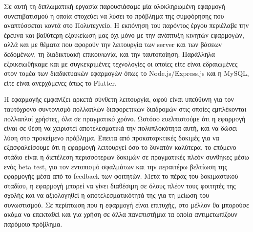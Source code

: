 \documentclass[../thesis.tex]{subfiles}
\begin{document}
Σε αυτή τη διπλωματική εργασία παρουσιάσαμε μία ολοκληρωμένη εφαρμογή συνεπιβατισμού η οποία στοχεύει να λύσει το πρόβλημα της συμφόρησης που αναπτύσσεται κοντά στο Πολυτεχνείο.
Η εκπόνηση του παρόντος έργου περιέλαβε την έρευνα και βαθύτερη εξοικείωσή μας όχι μόνο με την ανάπτυξη κινητών εφαρμογών, αλλά και με θέματα που αφορούν την λειτουργία των server και των βάσεων δεδομένων, τη διαδικτυακή επικοινωνία, και την ταυτοποίηση.
Παράλληλα εξοικειωθήκαμε και με συγκεκριμένες τεχνολογίες οι οποίες είτε είναι εδραιωμένες στον τομέα των διαδικτυακών εφαρμογών όπως το Node.js/Express.js και η MySQL, είτε είναι ανερχόμενες όπως το Flutter.

Η εφαρμογής εμφανίζει αρκετά σύνθετη λειτουργία, αφού είναι υπεύθυνη για τον ταυτόχρονο συντονισμό πολλαπλών διαφορετικών διαδρομών στις οποίες εμπλέκονται πολλαπλοί χρήστες, όλα σε πραγματικό χρόνο.
Ωστόσο ευελπιστούμε ότι η εφαρμογή είναι σε θέση να χειριστεί αποτελεσματικά την πολυπλοκότητα αυτή, και να δώσει λύση στο προκείμενο πρόβλημα.
Έπειτα από προκαταρκτικές δοκιμές για να εξασφαλείσουμε ότι η εφαρμογή λειτουργεί όσο το δυνατόν καλύτερα, το επόμενο στάδιο είναι η διετέλεση περισσότερων δοκιμών σε πραγματικές πλεόν συνθήκες μέσω ενός beta test, για τον εντοπισμό σφαλμάτων και την περαιτέρω βελτίωση της εφαρμογής μέσα από το feedback των φοιτητών.
Μετά το πέρας του δοκιμαστικού σταδίου, η εφαρμογή μπορεί να γίνει διαθέσιμη σε όλους πλέον τους φοιτητές της σχολής και να αξιολογηθεί η αποτελεσματικότητά της για τη μείωση του συνωστισμού.
Σε περίπτωση που η εφαρμογή είναι επιτυχής, στο μέλλον θα μπορούσε ακόμα να επεκταθεί και για χρήση σε άλλα πανεπιστήμια τα οποία αντιμετωπίζουν παρόμοιο πρόβλημα.
\end{document}
